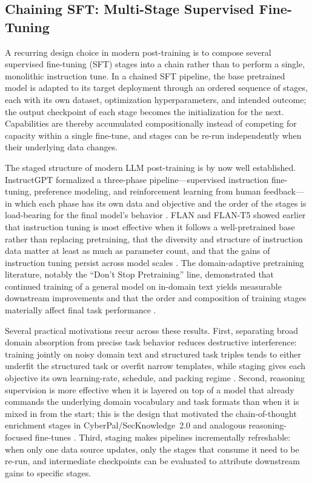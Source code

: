 \documentclass[unnumsec,webpdf,contemporary,large]{oup-authoring-template}
\theoremstyle{thmstyleone}
\theoremstyle{thmstyletwo}
\theoremstyle{thmstylethree}
\begin{document}
\subsection{Chaining SFT: Multi-Stage Supervised Fine-Tuning}
\label{sec:intro-chained-sft}

A recurring design choice in modern post-training is to compose several supervised fine-tuning (SFT) stages into a chain rather than to perform a single, monolithic instruction tune. In a chained SFT pipeline, the base pretrained model is adapted to its target deployment through an ordered sequence of stages, each with its own dataset, optimization hyperparameters, and intended outcome; the output checkpoint of each stage becomes the initialization for the next. Capabilities are thereby accumulated compositionally instead of competing for capacity within a single fine-tune, and stages can be re-run independently when their underlying data changes.

The staged structure of modern LLM post-training is by now well established. InstructGPT formalized a three-phase pipeline---supervised instruction fine-tuning, preference modeling, and reinforcement learning from human feedback---in which each phase has its own data and objective and the order of the stages is load-bearing for the final model's behavior \cite{ouyang2022instructgpt}. FLAN and FLAN-T5 showed earlier that instruction tuning is most effective when it follows a well-pretrained base rather than replacing pretraining, that the diversity and structure of instruction data matter at least as much as parameter count, and that the gains of instruction tuning persist across model scales \cite{wei2022flan,chung2022flant5}. The domain-adaptive pretraining literature, notably the ``Don't Stop Pretraining'' line, demonstrated that continued training of a general model on in-domain text yields measurable downstream improvements and that the order and composition of training stages materially affect final task performance \cite{gururangan2020dontstop}.

Several practical motivations recur across these results. First, separating broad domain absorption from precise task behavior reduces destructive interference: training jointly on noisy domain text and structured task triples tends to either underfit the structured task or overfit narrow templates, while staging gives each objective its own learning-rate, schedule, and packing regime \cite{gururangan2020dontstop,ouyang2022instructgpt}. Second, reasoning supervision is more effective when it is layered on top of a model that already commands the underlying domain vocabulary and task formats than when it is mixed in from the start; this is the design that motivated the chain-of-thought enrichment stages in CyberPal/SecKnowledge~2.0 and analogous reasoning-focused fine-tunes \cite{wei2022cot,levi2025toward}. Third, staging makes pipelines incrementally refreshable: when only one data source updates, only the stages that consume it need to be re-run, and intermediate checkpoints can be evaluated to attribute downstream gains to specific stages.
\end{document}
